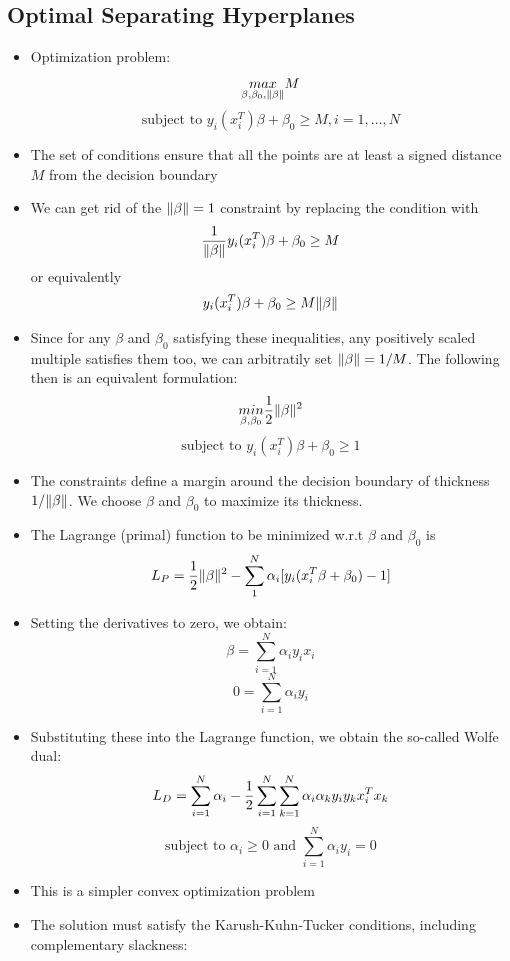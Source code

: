 \subsection*{Optimal Separating Hyperplanes}
\begin{itemize}
    \item
        Optimization problem:
        $$ \underset{\beta, \beta_0, \lVert\beta\rVert}{max} M$$
        $$ \text{subject to } y_i (x_i^T)\beta + \beta_0 \geq M, i=1,\dots,N$$ 
    \item
        The set of conditions ensure that all the points are at least a signed distance $M$ from the decision boundary
    \item
        We can get rid of the $\lVert\beta\rVert = 1$ constraint by replacing the condition with 
        $$\frac{\displaystyle 1}{\displaystyle \lVert\beta\rVert} y_i (x_i^T)\beta + \beta_0 \geq M$$
        or equivalently
        $$y_i (x_i^T)\beta + \beta_0 \geq M \lVert\beta\rVert$$
    \item
        Since for any $\beta$ and $\beta_0$ satisfying these inequalities, any positively scaled multiple satisfies them too, we can arbitratily set $\lVert\beta\rVert = 1/M$. The following then is an equivalent formulation:
        $$\underset{\beta, \beta_0}{min}\frac{\displaystyle 1}{\displaystyle 2} \lVert\beta\rVert^2$$
        $$\text{subject to } y_i (x_i^T)\beta + \beta_0 \geq 1$$
    \item
        The constraints define a margin around the decision boundary of thickness $1/\lVert\beta\rVert$. We choose $\beta$ and $\beta_0$ to maximize its thickness.
    \item
        The Lagrange (primal) function to be minimized w.r.t $\beta$ and $\beta_0$ is 
        $$L_P = \frac{\displaystyle 1}{\displaystyle 2} \lVert\beta\rVert^2 - \sum_1^N \alpha_i [y_i(x_i^T \beta + \beta_0) -1]$$
    \item
        Setting the derivatives to zero, we obtain:
        $$ \beta = \sum_{i=1}^{N} \alpha_i y_i x_i$$
        $$ 0 = \sum_{i=1}^N \alpha_i y_i $$
    \item
        Substituting these into the Lagrange function, we obtain the so-called Wolfe dual:
        $$ L_D = \sum_{i=1}^{N} \alpha_i - \frac{\displaystyle 1}{\displaystyle 2} \sum_{i=1}^{N} \sum_{k=1}^{N} \alpha_i \alpha_k y_i y_k x_i^T x_k$$
        $$ \text{subject to } \alpha_i \geq 0 \text{ and } \sum_{i=1}^{N} \alpha_i y_i = 0$$
    \item
        This is a simpler convex optimization problem
    \item
        The solution must satisfy the Karush-Kuhn-Tucker conditions, including complementary slackness:

\end{itemize}
